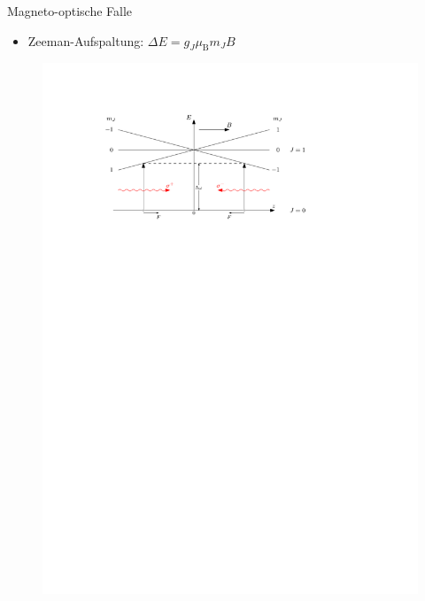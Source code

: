 \documentclass[12pt,xcolor=dvipsnames]{beamer}
\begin{document}
\begin{frame}{Magneto-optische Falle}
\begin{itemize}
	\item Zeeman-Aufspaltung: $\Delta E = g_J \mu_\mathrm{B} m_J B$
\end{itemize}

\vspace{0.5cm}

\begin{figure}[h]
	\centering
	\includegraphics[width=1\textwidth]{./figures/mot.pdf}
\end{figure}
\end{frame}
\end{document}
